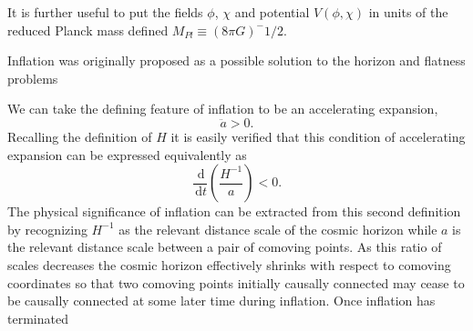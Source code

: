 \documentclass[letterpaper,11pt]{article}
\newcommand{\ud}{\,\mathrm{d}}
\begin{document}
It is further useful to put the fields $\phi$, $\chi$ and potential $V(\phi ,\chi )$ in units of the reduced Planck mass defined $M_{Pl} \equiv (8 \pi G)^-{1/2}$. 


Inflation was originally proposed as a possible solution to the horizon and flatness problems %

We can take the defining feature of inflation to be an accelerating expansion, 
\begin{equation}
\ddot{a}>0.
\end{equation}
Recalling the definition of $H$ it is easily verified that this condition of accelerating expansion can be expressed equivalently as
\begin{equation}
\frac{\ud}{\ud t}(\frac{H^{-1}}{a})<0.
\end{equation}
The physical significance of inflation can be extracted from this second definition by recognizing $H^{-1}$ as the relevant distance scale of the cosmic horizon while $a$ is the relevant distance scale between a pair of comoving points. As this ratio of scales decreases the cosmic horizon effectively shrinks with respect to comoving coordinates so that two comoving points initially causally connected may cease to be causally connected at some later time during inflation. Once inflation has terminated %

\end{document}
